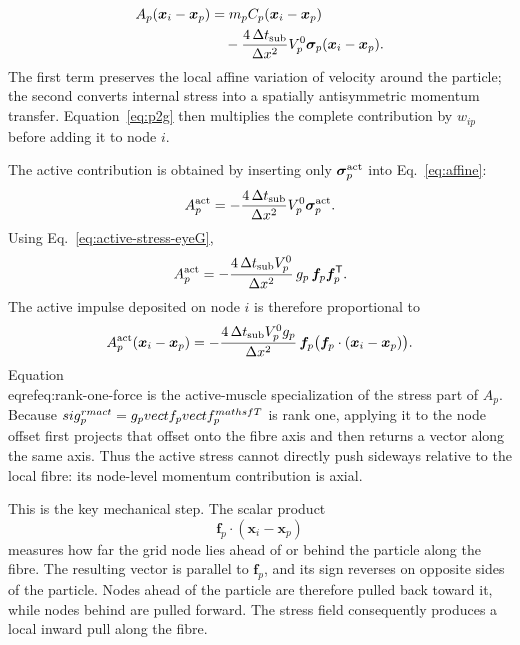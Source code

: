 \documentclass[11pt]{article}
\newcommand{\vect}[1]{\bm{#1}}
\newcommand{\sig}{\boldsymbol{\sigma}}
\begin{document}
\begin{equation}
\begin{aligned}
A_p(\vect x_i-\vect x_p)
&=m_pC_p(\vect x_i-\vect x_p)\\
&\quad-\frac{4\,\Delta t_{\rm sub}}{\Delta x^2}V_p^0\sig_p(\vect x_i-\vect x_p).
\end{aligned}
\label{eq:affine-times-offset}
\end{equation}
The first term preserves the local affine variation of velocity around the particle; the second converts internal stress into a spatially antisymmetric momentum transfer. Equation~\eqref{eq:p2g} then multiplies the complete contribution by $w_{ip}$ before adding it to node $i$.


The active contribution is obtained by inserting only $\sig^{\rm act}_p$ into Eq.~\eqref{eq:affine}:
\begin{equation}
A_p^{\rm act}
=-\frac{4\,\Delta t_{\rm sub}}{\Delta x^2}V_p^0\sig_p^{\rm act}.
\end{equation}
Using Eq.~\eqref{eq:active-stress-eyeG},
\begin{equation}
A_p^{\rm act}
=-\frac{4\,\Delta t_{\rm sub}V_p^0}{\Delta x^2}
\,g_p\,\vect f_p\vect f_p^{\mathsf T}.
\label{eq:active-affine}
\end{equation}
The active impulse deposited on node $i$ is therefore proportional to
\begin{equation}
A_p^{\rm act}(\vect x_i-\vect x_p)
=
-\frac{4\,\Delta t_{\rm sub}V_p^0g_p}{\Delta x^2}
\,\vect f_p\bigl(\vect f_p\cdot(\vect x_i-\vect x_p)\bigr).
\label{eq:rank-one-force}
\end{equation}
Equation~\\eqref{eq:rank-one-force} is the active-muscle specialization of the stress part of $A_p$.  Because $\\sig_p^{\\rm act}=g_p\\vect f_p\\vect f_p^{\\mathsf T}$ is rank one, applying it to the node offset first projects that offset onto the fibre axis and then returns a vector along the same axis.  Thus the active stress cannot directly push sideways relative to the local fibre: its node-level momentum contribution is axial.

This is the key mechanical step. The scalar product
\begin{equation}
\vect f_p\cdot(\vect x_i-\vect x_p)
\label{eq:auto11}
\end{equation}
measures how far the grid node lies ahead of or behind the particle along the fibre. The resulting vector is parallel to $\vect f_p$, and its sign reverses on opposite sides of the particle. Nodes ahead of the particle are therefore pulled back toward it, while nodes behind are pulled forward. The stress field consequently produces a local inward pull along the fibre.
\end{document}
